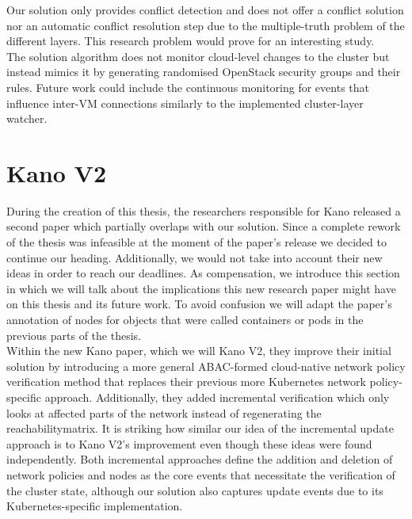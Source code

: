 Our solution only provides conflict detection and does not offer a conflict solution nor an automatic conflict resolution step due to the multiple-truth problem of the different layers. This research problem would prove for an interesting study.
\\[10pt]

The solution algorithm does not monitor cloud-level changes to the cluster but instead mimics it by generating randomised OpenStack security groups and their rules. Future work could include the continuous monitoring for events that influence inter-VM connections similarly to the implemented cluster-layer watcher.
\\[10pt]




\section{Kano V2} \label{sec:kanov2}
During the creation of this thesis, the researchers responsible for Kano released a second paper which partially overlaps with our solution.  Since a complete rework of the thesis was infeasible at the moment of the paper's release we decided to continue our heading. Additionally, we would not take into account their new ideas in order to reach our deadlines. As compensation, we introduce this section in which we will talk about the implications this new research paper might have on this thesis and its future work. To avoid confusion we will adapt the paper's annotation of nodes for objects that were called containers or pods in the previous parts of the thesis. \cite{kano2}
\\[10pt]

Within the new Kano paper, which we will Kano V2, they improve their initial solution by introducing a more general ABAC-formed cloud-native network policy verification method that replaces their previous more Kubernetes network policy-specific approach. Additionally, they added incremental verification which only looks at affected parts of the network instead of regenerating the reachabilitymatrix. It is striking how similar our idea of the incremental update approach is to Kano V2's improvement even though these ideas were found independently. Both incremental approaches define the addition and deletion of network policies and nodes as the core events that necessitate the verification of the cluster state, although our solution also captures update events due to its Kubernetes-specific implementation.
\\[10pt]

